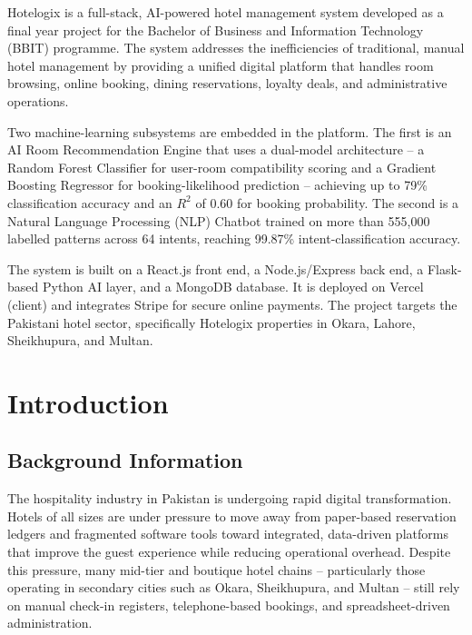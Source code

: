 \documentclass[12pt,a4paper]{report}
\begin{document}
Hotelogix is a full-stack, AI-powered hotel management system developed as a final year project for the Bachelor of Business and Information Technology (BBIT) programme. The system addresses the inefficiencies of traditional, manual hotel management by providing a unified digital platform that handles room browsing, online booking, dining reservations, loyalty deals, and administrative operations.

Two machine-learning subsystems are embedded in the platform. The first is an AI Room Recommendation Engine that uses a dual-model architecture -- a Random Forest Classifier for user-room compatibility scoring and a Gradient Boosting Regressor for booking-likelihood prediction -- achieving up to 79\% classification accuracy and an $R^2$ of 0.60 for booking probability. The second is a Natural Language Processing (NLP) Chatbot trained on more than 555,000 labelled patterns across 64 intents, reaching 99.87\% intent-classification accuracy.

The system is built on a React.js front end, a Node.js/Express back end, a Flask-based Python AI layer, and a MongoDB database. It is deployed on Vercel (client) and integrates Stripe for secure online payments. The project targets the Pakistani hotel sector, specifically Hotelogix properties in Okara, Lahore, Sheikhupura, and Multan.

\newpage
{}

\chapter{Introduction}

\section{Background Information}

The hospitality industry in Pakistan is undergoing rapid digital transformation. Hotels of all sizes are under pressure to move away from paper-based reservation ledgers and fragmented software tools toward integrated, data-driven platforms that improve the guest experience while reducing operational overhead. Despite this pressure, many mid-tier and boutique hotel chains -- particularly those operating in secondary cities such as Okara, Sheikhupura, and Multan -- still rely on manual check-in registers, telephone-based bookings, and spreadsheet-driven administration.
\end{document}
